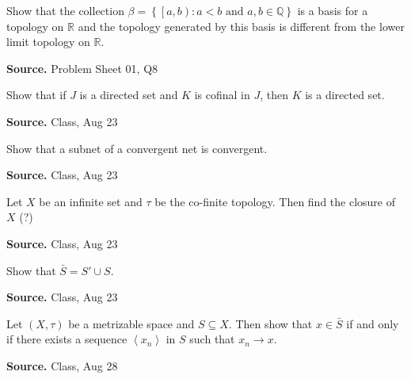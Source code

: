 \documentclass[12pt,twoside]{report}
\newenvironment*{source}{\hfill\scriptsize\textbf{Source.}\space}{\par}
\begin{document}
\begin{samepage}
\begin{ex}
    Show that the collection $\beta = \left\{ \left [a,b\right )  :  a < b \text{ and } a, b \in \mathbb{Q} \right\}$ is a basis for a topology on $\mathbb{R}$ and the topology generated by this basis is different from the lower limit topology on $\mathbb{R}$.
\end{ex}
\begin{source}
Problem Sheet 01, Q8
\end{source}
\end{samepage}

\begin{samepage}
\begin{ex}
Show that if $J$ is a directed set and $K$ is cofinal in $J$, then $K$ is a directed set.
\end{ex}
\begin{source}
Class, Aug 23
\end{source}
\end{samepage}

\begin{samepage}
\begin{ex}
Show that a subnet of a convergent net is convergent.
\end{ex}
\begin{source}
Class, Aug 23
\end{source}
\end{samepage}

\begin{samepage}
\begin{ex}
Let $X$ be an infinite set and $\tau$ be the co-finite topology. Then find the closure of $X$ (?)
\end{ex}
\begin{source}
Class, Aug 23
\end{source}
\end{samepage}

\begin{samepage}
\begin{ex}
Show that $\bar{S} = S' \cup S$.
\end{ex}
\begin{source}
Class, Aug 23
\end{source}
\end{samepage}

\begin{samepage}
\begin{ex}
Let $\left (X, \tau\right )$ be a metrizable space and $S \subseteq X$. Then show that $x \in \bar{S}$ if and only if there exists a sequence $\left\langle x_n\right\rangle $ in $S$ such that $x_n \to x$.
\end{ex}
\begin{source}
Class, Aug 28
\end{source}
\end{samepage}
\end{document}
